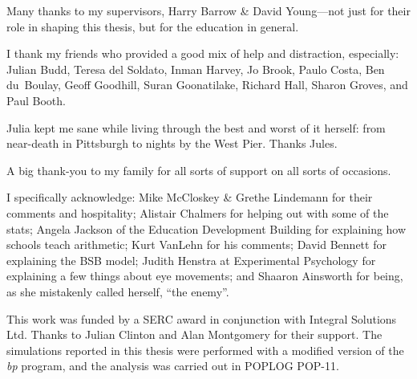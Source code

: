 \begin{acknowledgments}

Many thanks to my supervisors, Harry Barrow \& David Young---not just
for their role in shaping this thesis, but for the education in general.


I thank my friends who provided a good mix of help and distraction,
especially: Julian Budd, Teresa del Soldato, Inman Harvey, Jo Brook, Paulo
Costa, Ben du~Boulay, Geoff Goodhill, Suran Goonatilake, Richard Hall,
Sharon Groves, and Paul Booth.

Julia kept me sane while living through the best and worst of it
herself: from near-death in Pittsburgh to nights by the West Pier.
Thanks Jules.

A big thank-you to my family for all sorts of support on all sorts of
occasions.


I specifically acknowledge: Mike McCloskey \& Grethe
Lindemann for their comments and hospitality;
Alistair
Chalmers for helping out
with some of the stats; Angela Jackson of the Education Development
Building for explaining how schools teach arithmetic; 
Kurt VanLehn for his comments; David Bennett for
explaining the BSB model; Judith Henstra at Experimental Psychology
for explaining a few things about eye movements;
and Shaaron
Ainsworth for
being, as she mistakenly called herself, ``the enemy''.


This work was funded by a SERC award in conjunction with
Integral Solutions Ltd. Thanks to Julian Clinton and Alan Montgomery for
their support.  The simulations reported in this thesis were performed
with a modified
version of the  {\em bp} program, and the analysis was
carried out in POPLOG POP-11.

\end{acknowledgments}
